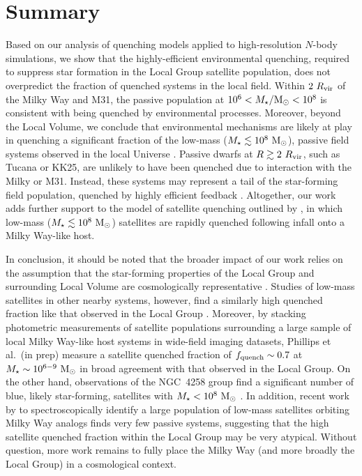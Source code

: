 \documentclass[usenatbib]{mnras}
\newcommand{\rvir}{R_{\rm vir}}
\newcommand{\mstar}{{M}_{\star}}
\newcommand{\msun}{{\rm M}_{\odot}}
\begin{document}
\section{Summary}
\label{sec:endgame}

Based on our analysis of quenching models applied to high-resolution $N$-body
simulations, we show that the highly-efficient environmental quenching, required
to suppress star formation in the Local Group satellite population, does not
overpredict the fraction of quenched systems in the local field. Within
$2~\rvir$ of the Milky Way and M31, the passive population at
$10^{6} < \mstar/\msun < 10^{8}$ is consistent with being quenched by
environmental processes.
%
Moreover, beyond the Local Volume, we conclude that environmental mechanisms are
likely at play in quenching a significant fraction of the low-mass
($\mstar \lesssim 10^{8}~\msun$), passive field systems observed in the local
Universe \citep[see also][]{simpson18}.
%
Passive dwarfs at $R \gtrsim 2~\rvir$, such as Tucana or KK25, are unlikely to
have been quenched due to interaction with the Milky or M31. Instead, these
systems may represent a tail of the star-forming field population, quenched by
highly efficient feedback \citep[e.g.][]{nihao1, dicintio17, fitts17}.
%
Altogether, our work adds further support to the model of satellite quenching
outlined by \citet{fham15, fham16}, in which low-mass
($\mstar \lesssim 10^{8}~\msun$) satellites are rapidly quenched following
infall onto a Milky Way-like host.
%


In conclusion, it should be noted that the broader impact of our work relies on
the assumption that the star-forming properties of the Local Group and
surrounding Local Volume are cosmologically representative \citep[i.e.~are not
atypical,][]{bk16}. 
%
Studies of low-mass satellites in other nearby systems, however, find a
similarly high quenched fraction like that observed in the Local Group
\citep[e.g.][]{kaisin13}. 
%
Moreover, by stacking photometric measurements of satellite
populations surrounding a large sample of local Milky Way-like host
systems in wide-field imaging datasets, Phillips et al.~(in prep)
measure a satellite quenched fraction of $f_{\rm quench} \sim 0.7$ at
$\mstar \sim 10^{6-9}~\msun$ in broad agreement with that observed in
the Local Group. 
%
On the other hand, observations of the NGC~4258 group find a significant number
of blue, likely star-forming, satellites with $\mstar < 10^{8}~\msun$
\citep{spencer14}. In addition, recent work by \citet{geha17} to
spectroscopically identify a large population of low-mass satellites orbiting
Milky Way analogs finds very few passive systems, suggesting that the high
satellite quenched fraction within the Local Group may be very atypical. Without
question, more work remains to fully place the Milky Way (and more broadly the
Local Group) in a cosmological context.
\end{document}
